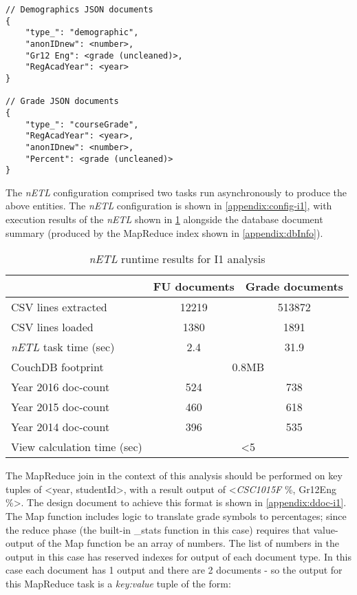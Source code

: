 \begin{verbatim}
// Demographics JSON documents
{
    "type_": "demographic",
    "anonIDnew": <number>,
    "Gr12 Eng": <grade (uncleaned)>,
    "RegAcadYear": <year>
}

// Grade JSON documents
{
    "type_": "courseGrade",
    "RegAcadYear": <year>,
    "anonIDnew": <number>,
    "Percent": <grade (uncleaned)>
}
\end{verbatim}

The \textit{nETL} configuration comprised two tasks run asynchronously to produce the above entities. The \textit{nETL} configuration is shown in \ref{appendix:config-i1}, with execution results of the \textit{nETL} shown in \ref{i1-results} alongside the database document summary (produced by the MapReduce index shown in \ref{appendix:dbInfo}).

\begin{table}[]
    \centering
    \caption{\textit{nETL} runtime results for I1 analysis}
    \label{i1-results}
    \begin{tabular}{lcc}
                                      & FU documents                    & Grade documents \\ \hline
        CSV lines extracted           & 12219                           & 513872          \\
        CSV lines loaded              & 1380                            & 1891            \\
        \textit{nETL} task time (sec) & 2.4                             & 31.9            \\
        CouchDB footprint             & \multicolumn{2}{c}{0.8MB}                         \\
        Year 2016 doc-count           & 524                             & 738             \\
        Year 2015 doc-count           & 460                             & 618             \\
        Year 2014 doc-count           & 396                             & 535             \\
        View calculation time (sec)   & \multicolumn{2}{c}{\textless 5}                   \\
    \end{tabular}
\end{table}

The MapReduce join in the context of this analysis should be performed on key tuples of <year, studentId>, with a result output of <\textit{CSC1015F} \%, Gr12Eng \%>. The design document to achieve this format is shown in \ref{appendix:ddoc-i1}. The Map function includes logic to translate grade symbols to percentages; since the reduce phase (the built-in \_stats function in this case) requires that value-output of the Map function be an array of numbers. The list of numbers in the output in this case has reserved indexes for output of each document type. In this case each document has 1 output and there are 2 documents - so the output for this MapReduce task is a \textit{key:value} tuple of the form:

